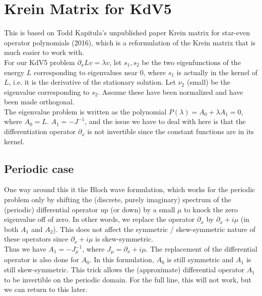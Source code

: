 \documentclass[12pt]{article}
\begin{document}
\section*{Krein Matrix for KdV5}

This is based on Todd Kapitula's unpublished paper Krein matrix for star-even operator polynomials (2016), which is a reformulation of the Krein matrix that is much easier to work with.\\

For our KdV5 problem $\partial_x L v = \lambda v$, let $s_1, s_2$ be the two eigenfunctions of the energy $L$ corresponding to eigenvalues near 0, where $s_1$ is actually in the kernel of $L$, i.e. it is the derivative of the stationary solution. Let $\nu_2$ (small) be the eigenvalue corresponding to $s_2$. Assume these have been normalized and have been made orthogonal.\\

The eigenvalue problem is written as the polynomial $P(\lambda) = A_0 + \lambda A_1 = 0$, where $A_0 = L$. $A_1 = -J^{-1}$, and the issue we have to deal with here is that the differentiation operator $\partial_x$ is not invertible since the constant functions are in its kernel.\\

\subsection*{Periodic case}

One way around this it the Bloch wave formulation, which works for the periodic problem only by shifting the (discrete, purely imaginary) spectrum of the (periodic) differential operator up (or down) by a small $\mu$ to knock the zero eigenvalue off of zero. In other words, we replace the operator $\partial_x$ by $\partial_x + i \mu$ (in both $A_1$ and $A_2$). This does not affect the symmetric / skew-symmetric nature of these operators since $\partial_x + i \mu$ is skew-symmetric.\\

Thus we have $A_1 = -J_\mu^{-1}$, where $J_\mu = \partial_x + i \mu$. The replacement of the differential operator is also done for $A_0$. In this formulation, $A_0$ is still symmetric and $A_1$ is still skew-symmetric. This trick allows the (approximate) differential operator $A_1$ to be invertible on the periodic domain. For the full line, this will not work, but we can return to this later.\\
\end{document}

